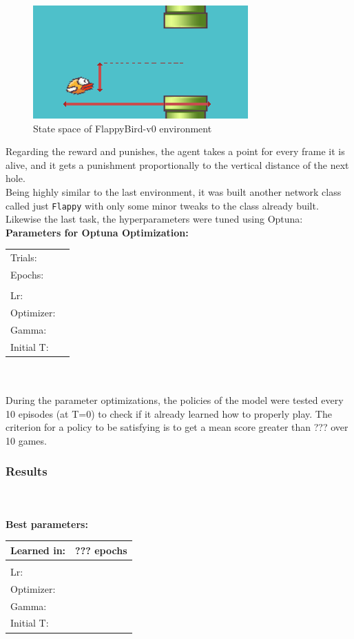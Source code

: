 \documentclass[11pt,a4paper,twocolumn]{IEEEtran}
\newcommand{\thinsepline}{\noindent\makebox[\linewidth]{\rule{7.5cm}{0.02pt}}}
\begin{document}
			\begin{figure}[h]
				\centering
				\includegraphics[width=0.75\linewidth]{../imgs/github1}
				\caption{State space of FlappyBird-v0 environment}
			\end{figure}
			Regarding the reward and punishes, the agent takes a point for every frame it is alive, and it gets a punishment proportionally to the vertical distance of the next hole.\medskip\\
		
			Being highly similar to the last environment, it was built another network class called just \texttt{Flappy} with only some minor tweaks to the class already built.
			Likewise the last task, the hyperparameters were tuned using Optuna:
			\thinsepline\\
			\textbf{Parameters for Optuna Optimization:}\medskip\\
			\begin{tabular}{ll}
				Trials: & \\
				Epochs: & \\
				\hline\\
				Lr: & \\
				Optimizer: & \\
				Gamma: & \\
				Initial T:& \\
			\end{tabular}\\
			\thinsepline\\
			During the parameter optimizations, the policies of the model were tested every 10 episodes (at T=0) to check if it already learned how to properly play. The criterion for a policy to be satisfying is to get a mean score greater than ??? over 10 games.
			\subsubsection{\textbf{Results}}\text{   }\\
			\thinsepline\\
			\textbf{Best parameters:}\medskip\\
			\begin{tabular}{ll}
				Learned in: & ??? epochs\\
				\hline\\
				Lr: & \\
				Optimizer: & \\
				Gamma: & \\
				Initial T:& \\
			\end{tabular}\\
			\thinsepline\\
\end{document}
